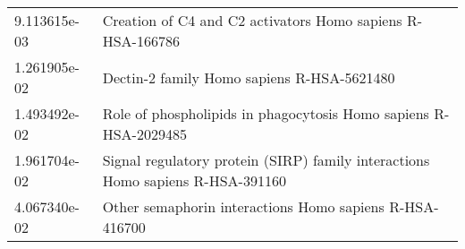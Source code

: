 \begin{longtable}{p{2.4cm}p{14.5cm}}
             9.113615e-03 &                                          Creation of C4 and C2 activators Homo sapiens R-HSA-166786 \\
             1.261905e-02 &                                                          Dectin-2 family Homo sapiens R-HSA-5621480 \\
             1.493492e-02 &                                    Role of phospholipids in phagocytosis Homo sapiens R-HSA-2029485 \\
             1.961704e-02 &                      Signal regulatory protein (SIRP) family interactions Homo sapiens R-HSA-391160 \\
             4.067340e-02 &                                             Other semaphorin interactions Homo sapiens R-HSA-416700 \\
\end{longtable}


